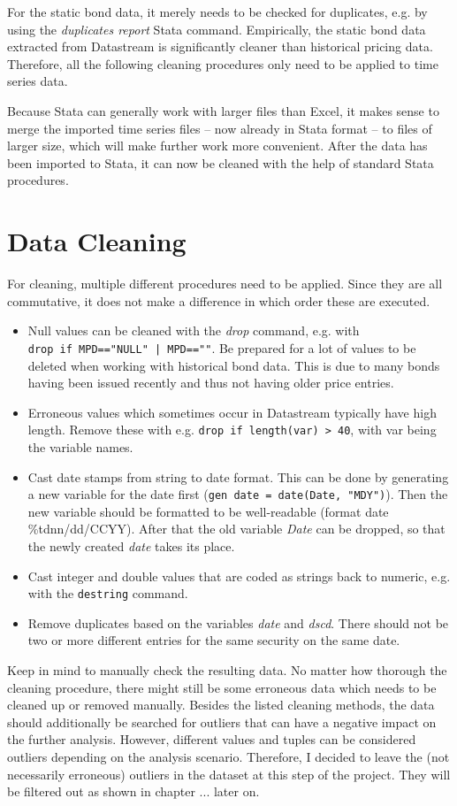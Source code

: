 For the static bond data, it merely needs to be checked for duplicates, e.g. by using the \textit{duplicates report} Stata command. 
Empirically, the static bond data extracted from Datastream is significantly cleaner than historical pricing data. 
Therefore, all the following cleaning procedures only need to be applied to time series data.

Because Stata can generally work with larger files than Excel, it makes sense to merge the imported time series files -- now already in Stata format -- to files of larger size, which will make further work more convenient. After the data has been imported to Stata, it can now be cleaned with the help of standard Stata procedures.  

\section{Data Cleaning}
For cleaning, multiple different procedures need to be applied. Since they are all commutative, it does not make a difference in which order these are executed. 
\begin{itemize}
	\item Null values can be cleaned with the \textit{drop} command, e.g. with \\ \lstinline{drop if MPD=="NULL" | MPD==""}. 
	Be prepared for a lot of values to be deleted when working with historical bond data. This is due to many bonds having been issued recently and thus not having older price entries. 
	\item Erroneous values which sometimes occur in Datastream typically have high length. Remove these with e.g. \lstinline{drop if length(var) > 40}, with var being the variable names. 
	\item Cast date stamps from string to date format. This can be done by generating a new variable for the date first (\lstinline{gen date = date(Date, "MDY")}). Then the new variable should be formatted to be well-readable (format date \%tdnn/dd/CCYY). After that the old variable \textit{Date} can be dropped, so that the newly created \textit{date} takes its place. 
	\item Cast integer and double values that are coded as strings back to numeric, e.g. with the \lstinline{destring} command. 
	\item Remove duplicates based on the variables \textit{date} and \textit{dscd}. There should not be two or more different entries for the same security on the same date.
\end{itemize}
Keep in mind to manually check the resulting data. No matter how thorough the cleaning procedure, there might still be some erroneous data which needs to be cleaned up or removed manually. Besides the listed cleaning methods, the data should additionally be searched for outliers that can have a negative impact on the further analysis. However, different values and tuples can be considered outliers depending on the analysis scenario. Therefore, I decided to leave the (not necessarily erroneous) outliers in the dataset at this step of the project. They will be filtered out as shown in chapter ... later on. %

